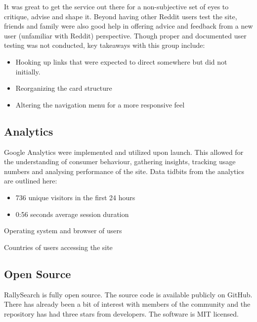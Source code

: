 \documentclass[msc,oneside]{ubcthesis}%
\begin{document}
It was great to get the service out there for a non-subjective set of eyes to critique, advise and shape it. Beyond having other Reddit users test the site, friends and family were also good help in offering advice and feedback from a new user (unfamiliar with Reddit) perspective. Though proper and documented user testing was not conducted, key takeaways with this group include:
\begin{itemize}
\item{Hooking up links that were expected to direct somewhere but did not initially.}
\item{Reorganizing the card structure}
\item{Altering the navigation menu for a more responsive feel}
\end{itemize}

\subsection{Analytics}
Google Analytics were implemented and utilized upon launch. This allowed for the understanding of consumer behaviour, gathering insights, tracking usage numbers and analysing performance of the site. Data tidbits from the analytics are outlined here:
\begin{itemize}
\item{736 unique visitors in the first 24 hours}
\item{0:56 seconds average session duration}
\end{itemize}
\begin{table}[H]
\begin{center}
\caption{Operating system and browser of users}\label{tab:osandbrowser}
\end{center}
\end{table}

\begin{table}[H]
\begin{center}
\caption{Countries of users accessing the site}\label{tab:country}
\end{center}
\end{table}

\subsection{Open Source}
RallySearch is fully open source. The source code is available publicly on GitHub. There has already been a bit of interest with members of the community and the repository has had three stars from developers. The software is MIT licensed. 
\end{document}
